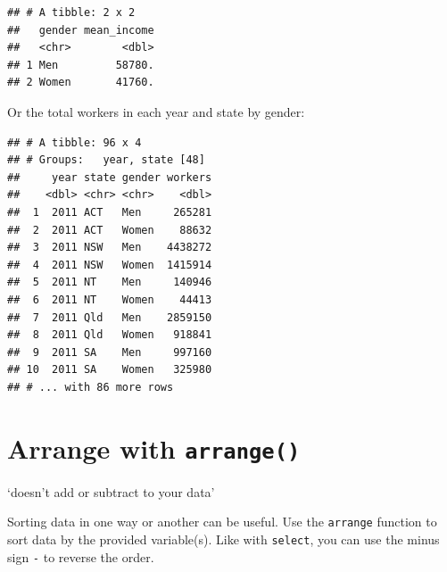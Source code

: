 \documentclass[]{book}
\newenvironment{Shaded}{\begin{snugshade}}{\end{snugshade}}
\newcommand{\DataTypeTok}[1]{\textcolor[rgb]{0.13,0.29,0.53}{#1}}
\newcommand{\KeywordTok}[1]{\textcolor[rgb]{0.13,0.29,0.53}{\textbf{#1}}}
\newcommand{\NormalTok}[1]{#1}
\newcommand{\OperatorTok}[1]{\textcolor[rgb]{0.81,0.36,0.00}{\textbf{#1}}}
\newcommand{\StringTok}[1]{\textcolor[rgb]{0.31,0.60,0.02}{#1}}
\begin{document}
\begin{Shaded}
\end{Shaded}

\begin{verbatim}
## # A tibble: 2 x 2
##   gender mean_income
##   <chr>        <dbl>
## 1 Men         58780.
## 2 Women       41760.
\end{verbatim}

Or the total workers in each year and state by gender:

\begin{Shaded}
\end{Shaded}

\begin{verbatim}
## # A tibble: 96 x 4
## # Groups:   year, state [48]
##     year state gender workers
##    <dbl> <chr> <chr>    <dbl>
##  1  2011 ACT   Men     265281
##  2  2011 ACT   Women    88632
##  3  2011 NSW   Men    4438272
##  4  2011 NSW   Women  1415914
##  5  2011 NT    Men     140946
##  6  2011 NT    Women    44413
##  7  2011 Qld   Men    2859150
##  8  2011 Qld   Women   918841
##  9  2011 SA    Men     997160
## 10  2011 SA    Women   325980
## # ... with 86 more rows
\end{verbatim}

\hypertarget{arrange-with-arrange}{%
\section{\texorpdfstring{Arrange with \texttt{arrange()}}{Arrange with arrange()}}\label{arrange-with-arrange}}

`doesn't add or subtract to your data'

Sorting data in one way or another can be useful. Use the \texttt{arrange} function to sort data by the provided variable(s). Like with \texttt{select}, you can use the minus sign \texttt{-} to reverse the order.
\end{document}
